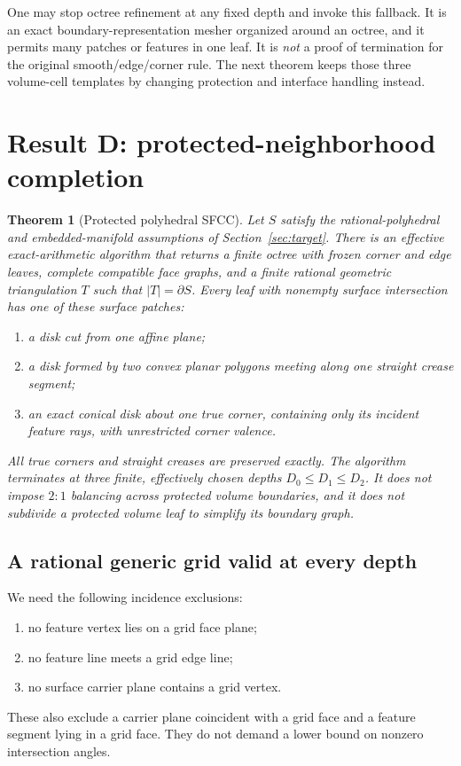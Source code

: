 \documentclass[11pt]{article}
\newtheorem{theorem}{Theorem}[section]
\theoremstyle{definition}
\theoremstyle{remark}
\begin{document}
One may stop octree refinement at any fixed depth and invoke this
fallback. It is an exact boundary-representation mesher organized
around an octree, and it permits many patches or features in one leaf.
It is \emph{not} a proof of termination for the original smooth/edge/corner
rule. The next theorem keeps those three volume-cell templates by
changing protection and interface handling instead.

\section{Result D: protected-neighborhood completion}
\label{sec:protected}

\begin{theorem}[Protected polyhedral SFCC]
\label{thm:main}
Let $S$ satisfy the rational-polyhedral and embedded-manifold assumptions
of Section~\ref{sec:target}. There is an effective exact-arithmetic
algorithm that returns a finite octree with frozen corner and edge
leaves, complete compatible face graphs, and a finite rational
geometric triangulation $T$ such that $|T|=\partial S$.
Every leaf with nonempty surface intersection has one of these surface
patches:
\begin{enumerate}[label=(\alph*)]
\item a disk cut from one affine plane;
\item a disk formed by two convex planar polygons meeting along one
  straight crease segment;
\item an exact conical disk about one true corner, containing only its
  incident feature rays, with unrestricted corner valence.
\end{enumerate}
All true corners and straight creases are preserved exactly. The
algorithm terminates at three finite, effectively chosen depths
$D_0\le D_1\le D_2$. It does not impose $2{:}1$ balancing across
protected volume boundaries, and it does not subdivide a protected
volume leaf to simplify its boundary graph.
\end{theorem}

\subsection{A rational generic grid valid at every depth}
\label{sec:generic-grid}

We need the following incidence exclusions:
\begin{enumerate}[label=(\roman*)]
\item no feature vertex lies on a grid face plane;
\item no feature line meets a grid edge line;
\item no surface carrier plane contains a grid vertex.
\end{enumerate}
These also exclude a carrier plane coincident with a grid face and
a feature segment lying in a grid face. They do not demand a lower
bound on nonzero intersection angles.
\end{document}
